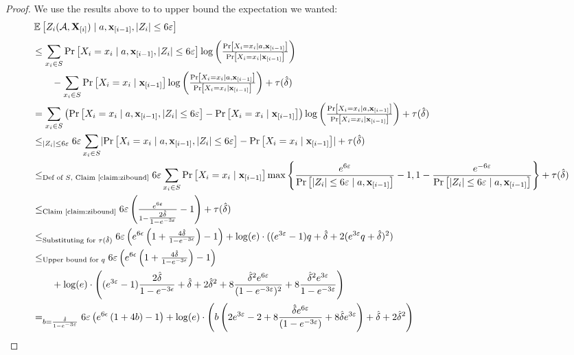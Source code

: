 \begin{proof}
We use the results above to to upper bound the expectation we wanted:
\ifnum{}
{\footnotesize
\allowdisplaybreaks[2]
\begin{align*}
& \Ex{}{Z_i(\cA,\bX_{[i]})\mid a,\bbx_{[i-1]}, \abs{Z_i}\leq 6\eps} \\
& \leq \sum_{x_i \in  S} \prob{X_i = x_i\mid a,\bbx_{[i-1]},\abs{Z_i}\leq 6\eps} \log\left( \tfrac{\prob{X_i = x_i \mid a,\bbx_{[i-1]}}}{\prob{X_i = x_i  \mid \bbx_{[i-1]}}} \right)  \\
& \qquad - \sum_{x_i \in  S} \prob{X_i = x_i  \mid \bbx_{[i-1]}} \log\left(\tfrac{\prob{X_i = x_i \mid a,\bbx_{[i-1]}}}{\prob{X_i = x_i  \mid \bbx_{[i-1]}}} \right) + \tau(\hat\delta) \\
& = \sum_{x_i \in  S} \left(\prob{X_i = x_i\mid a,\bbx_{[i-1]},\abs{Z_i}\leq 6\eps} - \prob{X_i = x_i  \mid \bbx_{[i-1]}}\right) \log\left( \tfrac{\prob{X_i = x_i \mid  a,\bbx_{[i-1]}}}{\prob{X_i = x_i  \mid \bbx_{[i-1]}}} \right)+ \tau(\hat\delta) \\
&\leq_{|Z_i| \leq 6\eps } 6\eps \sum_{x_i \in  S} \abs{\prob{X_i = x_i\mid a,\bbx_{[i-1]},\abs{Z_i}\leq 6\eps} - \prob{X_i = x_i  \mid \bbx_{[i-1]}}}+ \tau(\hat\delta) \\
& \leq_{\text{Def of $S$,  Claim~\ref{claim:zibound}}} 6\eps \sum_{x_i \in  S} \prob{X_i = x_i  \mid \bbx_{[i-1]}} \max\Bigg\{ \dfrac{e^{6\eps} }{\prob{|Z_i| \leq 6\eps \mid a,\bbx_{[i-1]}}} - 1, 1 - \dfrac{e^{-6\eps} }{\prob{|Z_i| \leq 6\eps \mid a,\bbx_{[i-1]}}}  \Bigg\} + \tau(\hat\delta) \\ 
& \leq_{\text{Claim~\ref{claim:zibound}}} 6\eps \left(\tfrac{e^{6\eps}}{1- \tfrac{2\hat\delta}{1-e^{-3\eps}}} - 1\right) + \tau(\hat\delta)\\
&\leq_{\text{Substituting for $\tau(\hat\delta)$}} 6\eps\left(e^{6\epsilon} \left( 1+ \tfrac{4\hat\delta}{1-e^{-3\epsilon} } \right) - 1 \right) + \log(e) \cdot ( (e^{3\eps}-1)q + \hat{\delta} + 2(e^{3\eps}q + \hat{\delta})^2 ) \\
& \leq_{\text{Upper bound for $q$}} 
6\eps\left(e^{6\epsilon} \left( 1+ \tfrac{4\hat\delta}{1-e^{-3\epsilon} } \right) - 1 \right) \\
& \qquad + \log(e) \cdot \left( (e^{3\eps}-1)\frac{2 \hat{\delta}}{1-e^{-3\epsilon}} + \hat{\delta} + 2 \hat{\delta}^2 + 8\frac{\hat{\delta}^2 e^{6 \eps}}{(1-e^{-3\eps})^2} + 8\frac{\hat{\delta}^2 e^{3 \eps}}{1-e^{-3\eps}} \right) \\
& =_{ b = \frac{\hat{\delta}}{1-e^{-3\eps}} } 
6\eps\left(e^{6\epsilon} \left( 1+ 4b \right) - 1 \right) + \log(e) \cdot \left( b \left( 2e^{3\eps} - 2  + 8\frac{\hat{\delta} e^{6 \eps}}{(1-e^{-3\eps})} + 8\hat{\delta} e^{3 \eps}\right) + \hat{\delta} + 2\hat{\delta}^2 \right) \\

\end{align*}}
\end{proof}
